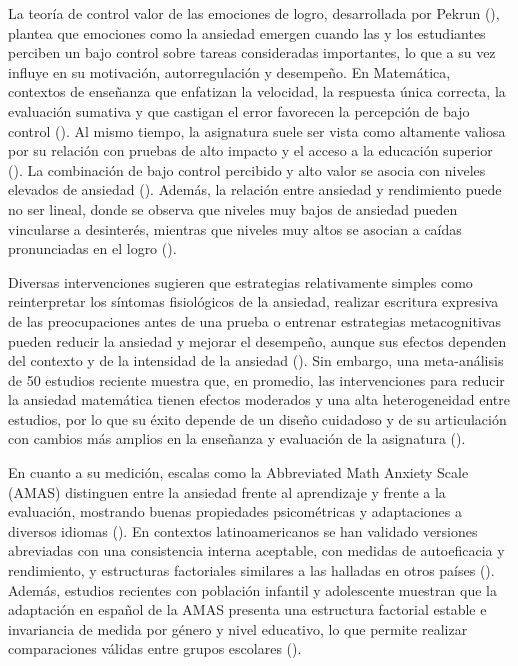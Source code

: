 \documentclass[
  spanish,
  a4paper,
  oneside]{scrbook}
\begin{document}
La teoría de control valor de las emociones de logro, desarrollada por
Pekrun (), plantea que emociones como la
ansiedad emergen cuando las y los estudiantes perciben un bajo control
sobre tareas consideradas importantes, lo que a su vez influye en su
motivación, autorregulación y desempeño. En Matemática, contextos de
enseñanza que enfatizan la velocidad, la respuesta única correcta, la
evaluación sumativa y que castigan el error favorecen la percepción de
bajo control (). Al
mismo tiempo, la asignatura suele ser vista como altamente valiosa por
su relación con pruebas de alto impacto y el acceso a la educación
superior (). La combinación de bajo
control percibido y alto valor se asocia con niveles elevados de
ansiedad (). Además, la
relación entre ansiedad y rendimiento puede no ser lineal, donde se
observa que niveles muy bajos de ansiedad pueden vincularse a
desinterés, mientras que niveles muy altos se asocian a caídas
pronunciadas en el logro ().

Diversas intervenciones sugieren que estrategias relativamente simples
como reinterpretar los síntomas fisiológicos de la ansiedad, realizar
escritura expresiva de las preocupaciones antes de una prueba o entrenar
estrategias metacognitivas pueden reducir la ansiedad y mejorar el
desempeño, aunque sus efectos dependen del contexto y de la intensidad
de la ansiedad (). Sin
embargo, una meta-análisis de 50 estudios reciente muestra que, en
promedio, las intervenciones para reducir la ansiedad matemática tienen
efectos moderados y una alta heterogeneidad entre estudios, por lo que
su éxito depende de un diseño cuidadoso y de su articulación con cambios
más amplios en la enseñanza y evaluación de la asignatura
().

En cuanto a su medición, escalas como la Abbreviated Math Anxiety Scale
(AMAS) distinguen entre la ansiedad frente al aprendizaje y frente a la
evaluación, mostrando buenas propiedades psicométricas y adaptaciones a
diversos idiomas (). En
contextos latinoamericanos se han validado versiones abreviadas con una
consistencia interna aceptable, con medidas de autoeficacia y
rendimiento, y estructuras factoriales similares a las halladas en otros
países (). Además,
estudios recientes con población infantil y adolescente muestran que la
adaptación en español de la AMAS presenta una estructura factorial
estable e invariancia de medida por género y nivel educativo, lo que
permite realizar comparaciones válidas entre grupos escolares
().
\end{document}
